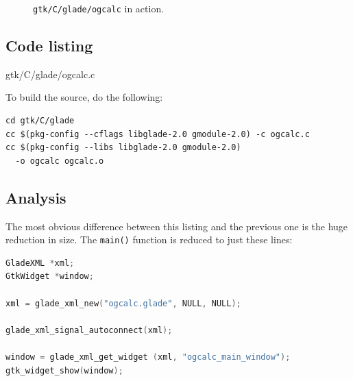 \documentclass[a4paper,oneside]{article}
\newcommand{\filename}[1]{\texttt{#1}}
\newcommand{\program}[1]{\texttt{#1}}
\newcommand{\function}[1]{\texttt{#1()}}
\begin{document}
\begin{figure}
  \centering
  \caption[\program{gtk/C/glade/ogcalc} in action]{\program{gtk/C/glade/ogcalc} in
    action.}
  \label{fig:ogcalcgl}
\end{figure}

\subsection{Code listing}


                 {gtk/C/glade/ogcalc.c}

To build the source, do the following:

\begin{verbatim}
cd gtk/C/glade
cc $(pkg-config --cflags libglade-2.0 gmodule-2.0) -c ogcalc.c
cc $(pkg-config --libs libglade-2.0 gmodule-2.0)
  -o ogcalc ogcalc.o
\end{verbatim}

\subsection{Analysis}

The most obvious difference between this listing and the previous one
is the huge reduction in size.  The \function{main} function is
reduced to just these lines:

\begin{lstlisting}[numbers=none, language=C]
GladeXML *xml;
GtkWidget *window;

xml = glade_xml_new("ogcalc.glade", NULL, NULL);

glade_xml_signal_autoconnect(xml);

window = glade_xml_get_widget (xml, "ogcalc_main_window");
gtk_widget_show(window);
\end{lstlisting}
\end{document}
